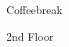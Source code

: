 \documentclass[a4paper]{article}
\begin{document}
\printVSLEventHeader{}{}
\begin{center}
\begin{vsltext}{3cm}{4cm}
    Coffeebreak

    \vspace{1cm}

    2nd Floor
\end{vsltext}

\end{center}
\end{document}

